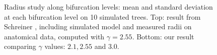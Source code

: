 \documentclass[a4paper, 11pt]{article} %
\begin{document}
\begin{figure}[htbp]
\centering
{}

\caption{Radius study along bifurcation levels: mean and standard deviation at each bifurcation level on 10 simulated trees. Top: result from Schreiner \cite{schreiner1993computer}, including simulated model and measured radii on anatomical data, computed with $\gamma = 2.55$. Bottom: our result comparing $\gamma$ values: $2.1, 2.55$ and $3.0$.}
\label{fig:Schreiner radii study}
\end{figure}
\end{document}
